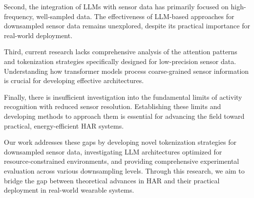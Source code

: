 Second, the integration of LLMs with sensor data has primarily focused on high-frequency, well-sampled data. The effectiveness of LLM-based approaches for downsampled sensor data remains unexplored, despite its practical importance for real-world deployment.

Third, current research lacks comprehensive analysis of the attention patterns and tokenization strategies specifically designed for low-precision sensor data. Understanding how transformer models process coarse-grained sensor information is crucial for developing effective architectures.

Finally, there is insufficient investigation into the fundamental limits of activity recognition with reduced sensor resolution. Establishing these limits and developing methods to approach them is essential for advancing the field toward practical, energy-efficient HAR systems.

Our work addresses these gaps by developing novel tokenization strategies for downsampled sensor data, investigating LLM architectures optimized for resource-constrained environments, and providing comprehensive experimental evaluation across various downsampling levels. Through this research, we aim to bridge the gap between theoretical advances in HAR and their practical deployment in real-world wearable systems.
